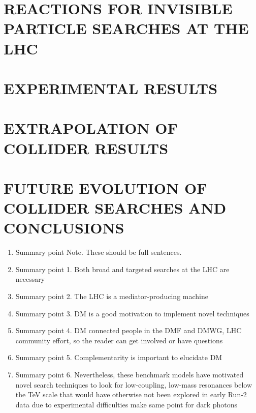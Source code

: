 \documentclass{ar-1col}
\begin{document}
%



\section{REACTIONS FOR INVISIBLE PARTICLE SEARCHES AT THE LHC}
\label{sec:02_Reactions}


\section{EXPERIMENTAL RESULTS}
\label{sec:03_ExperimentalResults}


\section{EXTRAPOLATION OF COLLIDER RESULTS}
\label{sec:04_Extrapolation}


\section{FUTURE EVOLUTION OF COLLIDER SEARCHES AND CONCLUSIONS}
\label{sec:05_Future}



\clearpage

\begin{summary}
\begin{enumerate}
\item Summary point Note. These should be full sentences.
\item Summary point 1. Both broad and targeted searches at the LHC are necessary
\item Summary point 2. The LHC is a mediator-producing machine
\item Summary point 3. DM is a good motivation to implement novel techniques 
\item Summary point 4. DM connected people in the DMF and DMWG, LHC community effort, so the reader can get involved or have questions
\item Summary point 5. Complementarity is important to elucidate DM 
\item Summary point 6. Nevertheless, these benchmark models have motivated novel search techniques
to look for low-coupling, low-mass resonances below the TeV scale that would
have otherwise not been explored in early Run-2 data due to experimental difficulties make same point for dark photons
\end{enumerate}
\end{summary}
\end{document}
